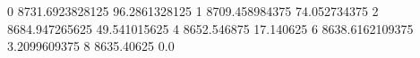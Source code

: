 0 8731.6923828125 96.2861328125
1 8709.458984375 74.052734375
2 8684.947265625 49.541015625
4 8652.546875 17.140625
6 8638.6162109375 3.2099609375
8 8635.40625 0.0
